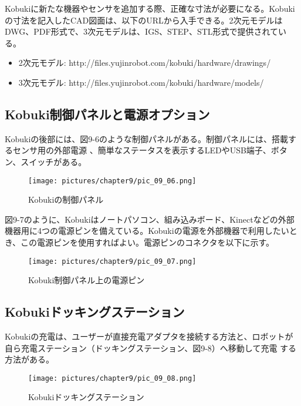 \begin{exercise}[KobukiのCAD図面の入手方法]
  Kobukiに新たな機器やセンサを追加する際、正確な寸法が必要になる。Kobukiの寸法を記入したCAD図面は、以下のURLから入手できる。2次元モデルはDWG、PDF形式で、3次元モデルは、IGS、STEP、STL形式で提供されている。
  \begin{itemize}
    \item  2次元モデル:  http://files.yujinrobot.com/kobuki/hardware/drawings/
    \item  3次元モデル:  http://files.yujinrobot.com/kobuki/hardware/models/
  \end{itemize}
\end{exercise}

\subsection{Kobuki制御パネルと電源オプション}

Kobukiの後部には、図9-6のような制御パネルがある。制御パネルには、搭載するセンサ用の外部電源  、簡単なステータスを表示するLEDやUSB端子、ボタン、スイッチがある。

\begin{figure}[htp]
  \centering
  \texttt{[image: pictures/chapter9/pic\_09\_06.png]}
  \caption{Kobukiの制御パネル}
\end{figure}

図9-7のように、Kobukiはノートパソコン、組み込みボード、Kinectなどの外部機器用に4つの電源ピンを備えている。Kobukiの電源を外部機器で利用したいとき、この電源ピンを使用すればよい。電源ピンのコネクタを以下に示す。

\begin{figure}[htp]
  \centering
  \texttt{[image: pictures/chapter9/pic\_09\_07.png]}
  \caption{Kobuki制御パネル上の電源ピン}
\end{figure}

\subsection{Kobukiドッキングステーション}

Kobukiの充電は、ユーザーが直接充電アダプタを接続する方法と、ロボットが自ら充電ステーション（ドッキングステーション、図9-8）へ移動して充電  する方法がある。

\begin{figure}[htp]
  \centering
  \texttt{[image: pictures/chapter9/pic\_09\_08.png]}
  \caption{Kobukiドッキングステーション}
\end{figure}

